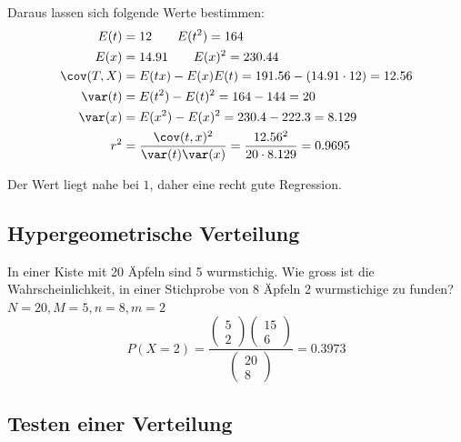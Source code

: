 \noindent Daraus lassen sich folgende Werte bestimmen:
\begin{align*}
	E(t) &= 12 \qquad E(t^2) = 164  \\
	E(x) &= 14.91 \qquad E(x)^2 = 230.44  \\
	\cov(T, X) &= E(tx) - E(x)E(t) = 191.56 - (14.91 \cdot 12) = 12.56 \\
	\var(t) &= E(t^2) - E(t)^2 = 164 - 144 = 20 \\
	\var(x) &= E(x^2) - E(x)^2 = 230.4 - 222.3 = 8.129 \\
	r^2 &= \frac{\cov(t, x)^2}{\var(t)\var(x)} = \frac{12.56^2}{20\cdot 8.129} = 0.9695
\end{align*}

\noindent Der Wert liegt nahe bei $1$, daher eine recht gute Regression.

\subsection{Hypergeometrische Verteilung}
In einer Kiste mit 20 Äpfeln sind 5 wurmstichig. Wie gross ist die Wahrscheinlichkeit, in einer Stichprobe von 8 Äpfeln 2 wurmstichige zu funden? $N= 20, M = 5, n = 8, m = 2$
\[
P(X= 2) = \frac{\begin{pmatrix} 5 \\ 2 \end{pmatrix}\begin{pmatrix} 15 \\ 6 \end{pmatrix}}{\begin{pmatrix} 20 \\ 8 \end{pmatrix}} = 0.3973
\]


\subsection{Testen einer Verteilung}

